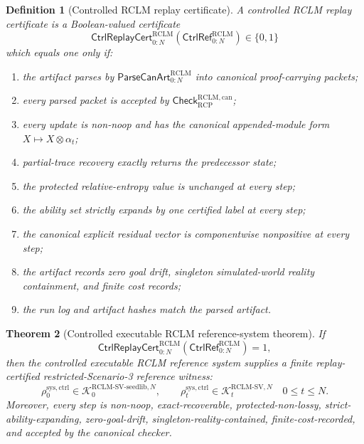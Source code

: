 \documentclass[11pt,a4paper]{article}
\newtheorem{theorem}{Theorem}[section]
\newtheorem{definition}[theorem]{Definition}
\newcommand{\Kcal}{\mathcal K}
\newcommand{\RCP}{\mathrm{RCP}}
\newcommand{\RCLM}{\mathrm{RCLM}}
\newcommand{\sys}{\mathrm{sys}}
\begin{document}
\begin{definition}[Controlled RCLM replay certificate]
\label{def:rclm-batch13rB-controlled-replay-certificate}
A controlled RCLM replay certificate is a Boolean-valued certificate
\[
\mathsf{CtrlReplayCert}_{0:N}^{\RCLM}(\mathsf{CtrlRef}_{0:N}^{\RCLM})\in\{0,1\}
\]
which equals one only if:
\begin{enumerate}[label=(\roman*),leftmargin=1.5em]
    \item the artifact parses by \(\mathsf{ParseCanArt}_{0:N}^{\RCLM}\) into canonical proof-carrying packets;
    \item every parsed packet is accepted by \(\mathsf{Check}_{\RCP}^{\RCLM,\mathrm{can}}\);
    \item every update is non-noop and has the canonical appended-module form \(X\mapsto X\otimes\alpha_t\);
    \item partial-trace recovery exactly returns the predecessor state;
    \item the protected relative-entropy value is unchanged at every step;
    \item the ability set strictly expands by one certified label at every step;
    \item the canonical explicit residual vector is componentwise nonpositive at every step;
    \item the artifact records zero goal drift, singleton simulated-world reality containment, and finite cost records;
    \item the run log and artifact hashes match the parsed artifact.
\end{enumerate}
\end{definition}

\begin{theorem}[Controlled executable RCLM reference-system theorem]
\label{thm:rclm-batch13rB-controlled-executable-reference-theorem}
If
\[
\mathsf{CtrlReplayCert}_{0:N}^{\RCLM}(\mathsf{CtrlRef}_{0:N}^{\RCLM})=1,
\]
then the controlled executable RCLM reference system supplies a finite replay-certified restricted-Scenario-3 reference witness:
\[
\rho_0^{\sys,\mathrm{ctrl}}
\in
\Kcal_0^{\RCLM\text{-}\mathrm{SV\mbox{-}seedlib},N},
\qquad
\rho_t^{\sys,\mathrm{ctrl}}
\in
\Kcal_t^{\RCLM\text{-}\mathrm{SV},N}
\quad 0\le t\le N.
\]
Moreover, every step is non-noop, exact-recoverable, protected-non-lossy, strict-ability-expanding, zero-goal-drift, singleton-reality-contained, finite-cost-recorded, and accepted by the canonical checker.
\end{theorem}
\end{document}

